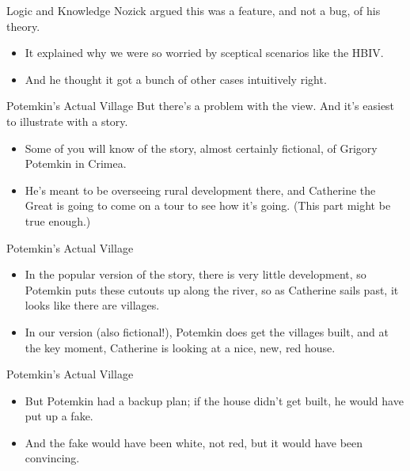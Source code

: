 \documentclass[
  17pt,
  letterpaper,
  ignorenonframetext,
  aspectratio=169,
]{beamer}
\providecommand{\tightlist}{%
  \setlength{\itemsep}{0pt}\setlength{\parskip}{0pt}}\usepackage{longtable,booktabs,array}
\begin{document}
\begin{frame}{Logic and Knowledge}
\protect\hypertarget{logic-and-knowledge}{}
Nozick argued this was a feature, and not a bug, of his theory.

\begin{itemize}[<+->]
\tightlist
\item
  It explained why we were so worried by sceptical scenarios like the
  HBIV.
\item
  And he thought it got a bunch of other cases intuitively right.
\end{itemize}
\end{frame}

\begin{frame}{Potemkin's Actual Village}
\protect\hypertarget{potemkins-actual-village}{}
But there's a problem with the view. And it's easiest to illustrate with
a story.

\begin{itemize}[<+->]
\tightlist
\item
  Some of you will know of the story, almost certainly fictional, of
  Grigory Potemkin in Crimea.
\item
  He's meant to be overseeing rural development there, and Catherine the
  Great is going to come on a tour to see how it's going. (This part
  might be true enough.)
\end{itemize}
\end{frame}

\begin{frame}{Potemkin's Actual Village}
\protect\hypertarget{potemkins-actual-village-1}{}
\begin{itemize}[<+->]
\tightlist
\item
  In the popular version of the story, there is very little development,
  so Potemkin puts these cutouts up along the river, so as Catherine
  sails past, it looks like there are villages.
\item
  In our version (also fictional!), Potemkin does get the villages
  built, and at the key moment, Catherine is looking at a nice, new, red
  house.
\end{itemize}
\end{frame}

\begin{frame}{Potemkin's Actual Village}
\protect\hypertarget{potemkins-actual-village-2}{}
\begin{itemize}[<+->]
\tightlist
\item
  But Potemkin had a backup plan; if the house didn't get built, he
  would have put up a fake.
\item
  And the fake would have been white, not red, but it would have been
  convincing.
\end{itemize}
\end{frame}
\end{document}
